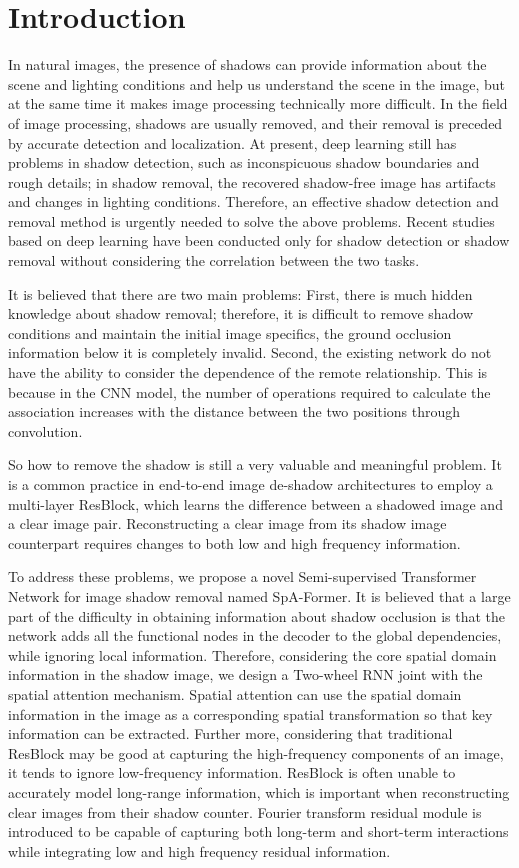 \documentclass[journal]{IEEEtran}
\begin{document}
\section{Introduction}
In natural images, the presence of shadows can provide information about the scene and lighting conditions and help us understand the scene in the image, but at the same time it makes image processing technically more difficult. In the field of image processing, shadows are usually removed, and their removal is preceded by accurate detection and localization. At present, deep learning still has problems in shadow detection, such as inconspicuous shadow boundaries and rough details; in shadow removal, the recovered shadow-free image has artifacts and changes in lighting conditions. Therefore, an effective shadow detection and removal method is urgently needed to solve the above problems. Recent studies based on deep learning have been conducted only for shadow detection or shadow removal without considering the correlation between the two tasks.
\par
It is believed that there are two main problems: First, there is much hidden knowledge about shadow removal; therefore, it is difficult to remove shadow conditions and maintain the initial image specifics, the ground occlusion information below it is completely invalid. Second, the existing network do not have the ability to consider the dependence of the remote relationship. This is because in the CNN model, the number of operations required to calculate the association increases with the distance between the two positions through convolution.
\par
 So how to remove the shadow is still a very valuable and meaningful problem. It is a common practice in end-to-end image de-shadow architectures to employ a multi-layer ResBlock, which learns the difference between a shadowed image and a clear image pair. Reconstructing a clear image from its shadow image counterpart requires changes to both low and high frequency information.
\par
To address these problems, we propose a novel Semi-supervised Transformer Network for image shadow removal named SpA-Former. It is believed that a large part of the difficulty in obtaining information about shadow occlusion is that the network adds all the functional nodes in the decoder to the global dependencies, while ignoring local information. Therefore, considering the core spatial domain information in the shadow image, we design a Two-wheel RNN joint with the spatial attention mechanism. Spatial attention can use the spatial domain information in the image as a corresponding spatial transformation so that key information can be extracted. Further more, considering that traditional ResBlock may be good at capturing the high-frequency components of an image, it tends to ignore low-frequency information. ResBlock is often unable to accurately model long-range information, which is important when reconstructing clear images from their shadow counter. Fourier transform residual module is introduced to be capable of capturing both long-term and short-term interactions while integrating low and high frequency residual information.
\end{document}
